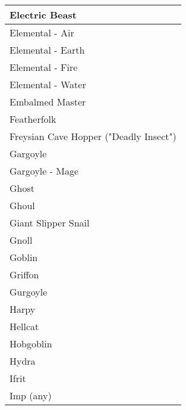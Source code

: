 \documentclass[twoside]{book}
\begin{document}
\begin{longtable}{p{1.25in}}
  \raggedright
           Electric Beast 
  \tabularnewline
  \hline
      
  \raggedright
           Elemental - Air 
  \tabularnewline
  \hline
      
  \raggedright
           Elemental - Earth 
  \tabularnewline
  \hline
      
  \raggedright
           Elemental - Fire 
  \tabularnewline
  \hline
      
  \raggedright
           Elemental - Water 
  \tabularnewline
  \hline
      
  \raggedright
           Embalmed Master 
  \tabularnewline
  \hline
      
  \raggedright
           Featherfolk 
  \tabularnewline
  \hline
      
  \raggedright
           Freysian Cave Hopper ("Deadly
           Insect") 
  \tabularnewline
  \hline
      
  \raggedright
           Gargoyle 
  \tabularnewline
  \hline
      
  \raggedright
           Gargoyle - Mage 
  \tabularnewline
  \hline
      
  \raggedright
           Ghost 
  \tabularnewline
  \hline
      
  \raggedright
           Ghoul 
  \tabularnewline
  \hline
      
  \raggedright
           Giant Slipper Snail 
  \tabularnewline
  \hline
      
  \raggedright
           Gnoll 
  \tabularnewline
  \hline
      
  \raggedright
           Goblin 
  \tabularnewline
  \hline
      
  \raggedright
           Griffon 
  \tabularnewline
  \hline
      
  \raggedright
           Gurgoyle 
  \tabularnewline
  \hline
      
  \raggedright
           Harpy 
  \tabularnewline
  \hline
      
  \raggedright
           Hellcat 
  \tabularnewline
  \hline
      
  \raggedright
           Hobgoblin 
  \tabularnewline
  \hline
      
  \raggedright
           Hydra 
  \tabularnewline
  \hline
      
  \raggedright
           Ifrit 
  \tabularnewline
  \hline
      
  \raggedright
           Imp (any) 
  \tabularnewline
  \hline
      

\end{longtable}
\end{document}
